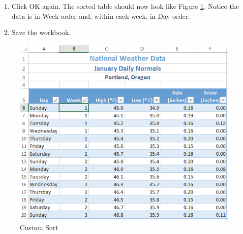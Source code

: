 \begin{enumerate}
	\item Click OK again. The sorted table should now look like Figure \ref{05:fig15}. Notice the data is in Week order and, within each week, in Day order.
\item Save the workbook.
\end{enumerate}

\begin{figure}[H]
	\centering
	\includegraphics[width=\maxwidth{.95\linewidth}]{gfx/ch05_fig15}
	\caption{Custom Sort}
	\label{05:fig15}
\end{figure}

